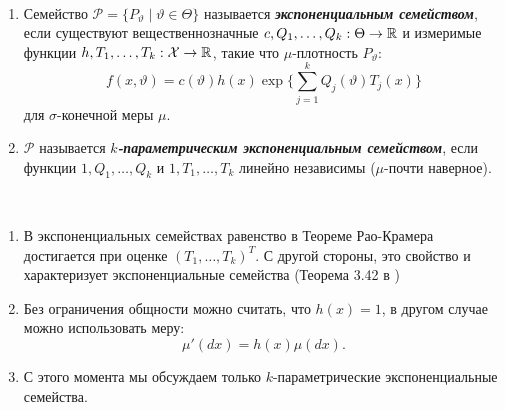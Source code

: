 \begin{defn} \
	\begin{enumerate}
		\item Семейство $\mathcal{P}= \{ P_\vartheta \mid \vartheta \in \Theta \}$ называется \textbf{\textit{экспоненциальным семейством}}, если существуют вещественнозначные $c, Q_1, \dots, Q_k : \Theta \rightarrow \mathbb{R}$ и измеримые функции $h, T_1, \dots, T_k: \mathcal{X} \rightarrow \mathbb{R}$, такие что $\mu$-плотность $P_\vartheta$:
		\[ f(x, \vartheta)=c(\vartheta)h(x)\exp \Big\{ \sum_{j=1}^{k}Q_j(\vartheta)T_j(x) \Big\} \]
		для $\sigma$-конечной меры $\mu$.
		\item $\mathcal{P}$ называется \textbf{\textit{$k$-параметрическим экспоненциальным семейством}}, если функции $1,Q_1, \dots, Q_k$ и $1,T_1, \dots, T_k$ линейно независимы ($\mu$-почти наверное).
	\end{enumerate}
\end{defn}

\begin{rmrk}\
	\begin{enumerate}
		\item В экспоненциальных семействах равенство в Теореме Рао-Крамера достигается при оценке $(T_1,\dots,T_k)^T$. С другой стороны, это свойство и характеризует экспоненциальные семейства (Теорема 3.42 в \cite{BickelDoksum})
		\item Без ограничения общности можно считать, что $h(x) = 1$, в другом случае можно использовать меру:
		\[ \mu'(dx)=h(x)\mu(dx). \]
		\item С этого момента мы обсуждаем только $k$-параметрические экспоненциальные семейства.
	\end{enumerate}
\end{rmrk}

